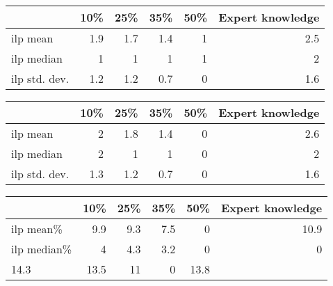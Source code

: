 \begin{tabular}{lrrrrr}
\hline
               &   10\% &   25\% &   35\% &   50\% &   Expert knowledge \\
\hline
 ilp mean      &   1.9 &   1.7 &   1.4 &     1 &                2.5 \\
 ilp median    &   1   &   1   &   1   &     1 &                2   \\
 ilp std. dev. &   1.2 &   1.2 &   0.7 &     0 &                1.6 \\
\hline
\end{tabular}\begin{tabular}{lrrrrr}
\hline
               &   10\% &   25\% &   35\% &   50\% &   Expert knowledge \\
\hline
 ilp mean      &   2   &   1.8 &   1.4 &     0 &                2.6 \\
 ilp median    &   2   &   1   &   1   &     0 &                2   \\
 ilp std. dev. &   1.3 &   1.2 &   0.7 &     0 &                1.6 \\
\hline
\end{tabular}\begin{tabular}{lrrrrr}
\hline
             &   10\% &   25\% &   35\% &   50\% &   Expert knowledge \\
\hline
 ilp mean\%   &   9.9 &   9.3 &   7.5 &   0   &               10.9 \\
 ilp median\% &   4   &   4.3 &   3.2 &   0   &                0   \\
 14.3        &  13.5 &  11   &   0   &  13.8 &                    \\
\hline
\end{tabular}